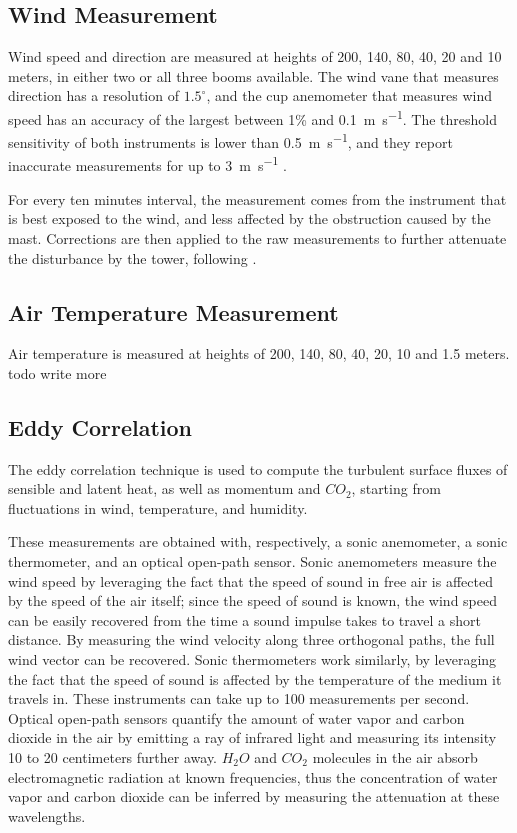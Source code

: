 \documentclass[12pt]{book}
\begin{document}
\subsection{Wind Measurement}
Wind speed and direction are measured at heights of 200, 140, 80, 40, 20 and 10 meters, in either two or all three booms available. The wind vane that measures direction has a resolution of $1.5^\circ$, and the cup anemometer that measures wind speed has an accuracy of the largest between 1\% and \SI{0.1}{\meter\per\second}. The threshold sensitivity of both instruments is lower than \SI{0.5}{\meter\per\second}, and they report inaccurate measurements for up to \SI{3}{\meter\per\second} \cite{windinstr}.

For every ten minutes interval, the measurement comes from the instrument that is best exposed to the wind, and less affected by the obstruction caused by the mast. Corrections are then applied to the raw measurements to further attenuate the disturbance by the tower, following \cite{winddistortion}.

\subsection{Air Temperature Measurement}
Air temperature is measured at heights of 200, 140, 80, 40, 20, 10 and 1.5 meters. todo write more

\subsection{Eddy Correlation}
The eddy correlation technique is used to compute the turbulent surface fluxes of sensible and latent heat, as well as momentum and $CO_2$, starting from fluctuations in wind, temperature, and humidity.

These measurements are obtained with, respectively, a sonic anemometer, a sonic thermometer, and an optical open-path sensor. Sonic anemometers measure the wind speed by leveraging the fact that the speed of sound in free air is affected by the speed of the air itself; since the speed of sound is known, the wind speed can be easily recovered from the time a sound impulse takes to travel a short distance. By measuring the wind velocity along three orthogonal paths, the full wind vector can be recovered. Sonic thermometers work similarly, by leveraging the fact that the speed of sound is affected by the temperature of the medium it travels in. These instruments can take up to 100 measurements per second. Optical open-path sensors quantify the amount of water vapor and carbon dioxide in the air by emitting a ray of infrared light and measuring its intensity 10 to 20 centimeters further away. $H_2O$ and $CO_2$ molecules in the air absorb electromagnetic radiation at known frequencies, thus the concentration of water vapor and carbon dioxide can be inferred by measuring the attenuation at these wavelengths.
\end{document}
